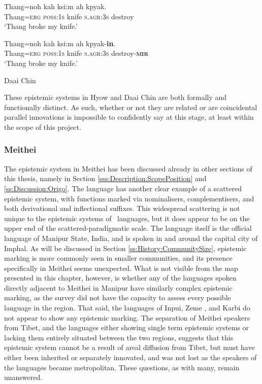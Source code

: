 \begin{exe}
\ex\label{e:History:DaaiChin}
\begin{xlist}
    \ex
\gll Thang=noh kah ksi:m ah kpyak. \\
Thang=\textsc{erg} \textsc{poss:1s} knife \textsc{s.agr:3s} destroy \\
\glt `Thang broke my knife.'

\ex
\gll Thang=noh kah ksi:m ah kpyak-\textbf{in}. \\
Thang=\textsc{erg} \textsc{poss:1s} knife \textsc{s.agr:3s} destroy-\textsc{\textbf{mir}} \\
\glt `Thang broke my knife.'
\end{xlist}
Daai Chin \cite[Kukish: Myanmar,][294]{SoHartmann2009}
\end{exe}

These epistemic systems in Hyow and Daai Chin are both formally and functionally distinct. As such, whether or not they are related or are coincidental parallel innovations is impossible to confidently say at this stage, at least within the scope of this project.

\subsubsection{Meithei}
The epistemic system in Meithei \cite[Internal isolate: India,][]{Chelliah1997} has been discussed already in other sections of this thesis, namely in Section \ref{sss:Description:ScopePosition} and \ref{ss:Discussion:Origo}. The language has another clear example of a scattered epistemic system, with functions marked via nominalisers, complementisers, and both derivational and inflectional suffixes. This widespread scattering is not unique to the epistemic systems of \lfam\ languages, but it does appear to be on the upper end of the scattered-paradigmatic scale. The language itself is the official language of Manipur State, India, and is spoken in and around the capital city of Imphal. As will be discussed in Section \ref{ss:History:CommunitySize}, epistemic marking is more commonly seen in smaller communities, and its presence specifically in Meithei seems unexpected. What is not visible from the map presented in this chapter, however, is whether any of the languages spoken directly adjacent to Meithei in Manipur have similarly complex epistemic marking, as the survey did not have the capacity to assess every possible language in the region. That said, the languages of Inpui, Zeme \cites[both Zeme subfamily][]{Devi2014}{Chanu2017}, and Karbi \cite[Karbic][]{Konnerth2020} do not appear to show any epistemic marking. The separation of Meithei speakers from Tibet, and the languages either showing single term epistemic systems or lacking them entirely situated between the two regions, suggests that this epistemic system cannot be a result of areal diffusion from Tibet, but must have either been inherited or separately innovated, and was not lost as the speakers of the languages became metropolitan. These questions, as with many, remain unanswered.

